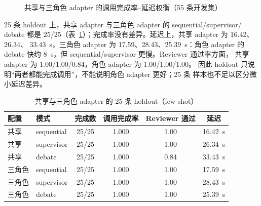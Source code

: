 \documentclass[UTF8,a4paper,12pt]{ctexart}
\begin{document}
\begin{figure}[H]
  \centering
  \caption{共享与三角色 adapter 的调用完成率--延迟权衡（55 条开发集）}
  \label{fig:roletradeoff}
\end{figure}

25 条 holdout 上，共享 adapter 与三角色 adapter 的 sequential/supervisor/
debate 都是 25/25（表~\ref{tab:holdout}）；完成率没有差异。延迟上，共享 adapter 为 16.42、26.34、
33.43~s，三角色 adapter 为 17.59、28.43、25.39~s：角色 adapter 的
debate 快约 8~s，但 sequential/supervisor 更慢。Reviewer 通过率方面，
共享 adapter 为 1.00/1.00/0.84，角色 adapter 为 1.00/1.00/1.00。
因此 holdout 只说明“两者都能完成调用”，不能说明角色 adapter 更好；25 条
样本也不足以区分微小延迟差异。

\begin{table}[H]
  \centering
  \small
  \caption{共享与三角色 adapter 的 25 条 holdout（few-shot）}
  \label{tab:holdout}
  \begin{tabular}{llcccc}
    \toprule
    配置 & 模式 & 完成数 & 调用完成率 & Reviewer 通过 & 延迟 \\
    \midrule
    共享 & sequential & 25/25 & 1.000 & 1.00 & 16.42~s \\
    共享 & supervisor & 25/25 & 1.000 & 1.00 & 26.34~s \\
    共享 & debate & 25/25 & 1.000 & 0.84 & 33.43~s \\
    三角色 & sequential & 25/25 & 1.000 & 1.00 & 17.59~s \\
    三角色 & supervisor & 25/25 & 1.000 & 1.00 & 28.43~s \\
    三角色 & debate & 25/25 & 1.000 & 1.00 & 25.39~s \\
    \bottomrule
  \end{tabular}
\end{table}
\end{document}
